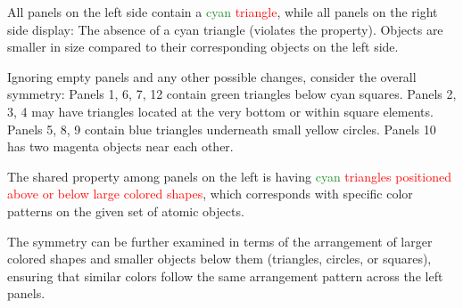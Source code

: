 \begin{tcolorbox}[breakable,enhanced jigsaw,opacityback=0,]
\begin{dialogue}
		All panels on the left side contain a \textcolor{ForestGreen}{cyan} \textcolor{red}{triangle}, while all panels on the right side display:
		The absence of a cyan triangle (violates the property).
		Objects are smaller in size compared to their corresponding objects on the left side.
		
		Ignoring empty panels and any other possible changes, consider the overall symmetry:
		Panels 1, 6, 7, 12 contain green triangles below cyan squares.
		Panels 2, 3, 4 may have triangles located at the very bottom or within square elements.
		Panels 5, 8, 9 contain blue triangles underneath small yellow circles.
		Panels 10 has two magenta objects near each other.
		
		The shared property among panels on the left is having \textcolor{ForestGreen}{cyan} \textcolor{red}{triangles positioned above or below large colored shapes}, which corresponds with specific color patterns on the given set of atomic objects.
		
		The symmetry can be further examined in terms of the arrangement of larger colored shapes and smaller objects below them (triangles, circles, or squares), ensuring that similar colors follow the same arrangement pattern across the left panels.
		
	\end{dialogue}
	\label{fig:task6-bongard}
\end{tcolorbox}




